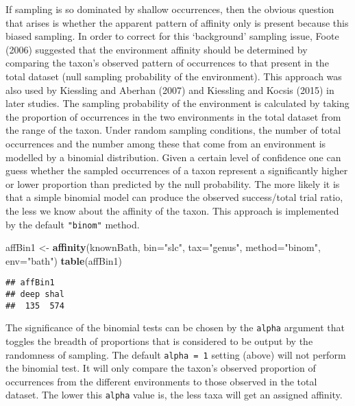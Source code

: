 \documentclass[]{article}
\newenvironment{Shaded}{\begin{snugshade}}{\end{snugshade}}
\newcommand{\KeywordTok}[1]{\textcolor[rgb]{0.13,0.29,0.53}{\textbf{{#1}}}}
\newcommand{\DataTypeTok}[1]{\textcolor[rgb]{0.13,0.29,0.53}{{#1}}}
\newcommand{\StringTok}[1]{\textcolor[rgb]{0.31,0.60,0.02}{{#1}}}
\newcommand{\NormalTok}[1]{{#1}}
\begin{document}
If sampling is so dominated by shallow occurrences, then the obvious
question that arises is whether the apparent pattern of affinity only is
present because this biased sampling. In order to correct for this
`background' sampling issue, Foote (2006) suggested that the environment
affinity should be determined by comparing the taxon's observed pattern
of occurrences to that present in the total dataset (null sampling
probability of the environment). This approach was also used by
Kiessling and Aberhan (2007) and Kiessling and Kocsis (2015) in later
studies. The sampling probability of the environment is calculated by
taking the proportion of occurrences in the two environments in the
total dataset from the range of the taxon. Under random sampling
conditions, the number of total occurrences and the number among these
that come from an environment is modelled by a binomial distribution.
Given a certain level of confidence one can guess whether the sampled
occurrences of a taxon represent a significantly higher or lower
proportion than predicted by the null probability. The more likely it is
that a simple binomial model can produce the observed success/total
trial ratio, the less we know about the affinity of the taxon. This
approach is implemented by the default \texttt{"binom"} method.

\begin{Shaded}
\begin{Highlighting}[]
\NormalTok{affBin1 <-}\StringTok{ }\KeywordTok{affinity}\NormalTok{(knownBath, }\DataTypeTok{bin=}\StringTok{"slc"}\NormalTok{, }\DataTypeTok{tax=}\StringTok{"genus"}\NormalTok{, }
  \DataTypeTok{method=}\StringTok{"binom"}\NormalTok{, }\DataTypeTok{env=}\StringTok{"bath"}\NormalTok{)}
\KeywordTok{table}\NormalTok{(affBin1)}
\end{Highlighting}
\end{Shaded}

\begin{verbatim}
## affBin1
## deep shal 
##  135  574
\end{verbatim}

The significance of the binomial tests can be chosen by the
\texttt{alpha} argument that toggles the breadth of proportions that is
considered to be output by the randomness of sampling. The default
\texttt{alpha\ =\ 1} setting (above) will not perform the binomial test.
It will only compare the taxon's observed proportion of occurrences from
the different environments to those observed in the total dataset. The
lower this \texttt{alpha} value is, the less taxa will get an assigned
affinity.
\end{document}
